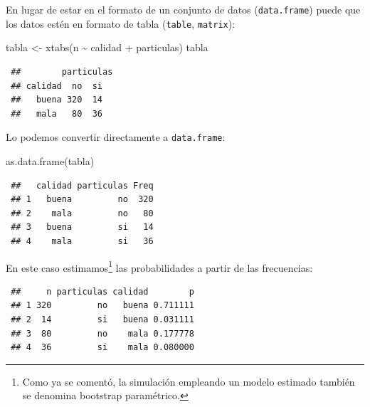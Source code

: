 \documentclass[
  10pt,
]{book}
\newenvironment{Shaded}{\begin{snugshade}}{\end{snugshade}}
\newcommand{\FunctionTok}[1]{\textcolor[rgb]{0.00,0.00,0.00}{#1}}
\newcommand{\NormalTok}[1]{#1}
\newcommand{\OtherTok}[1]{\textcolor[rgb]{0.56,0.35,0.01}{#1}}
\newcommand{\SpecialCharTok}[1]{\textcolor[rgb]{0.00,0.00,0.00}{#1}}
\theoremstyle{break}
\theoremstyle{nonumberplain}
\let\oldfootnote\footnote
\renewcommand\footnote[1]{\oldfootnote{\hspace{2mm}#1}}
\begin{document}
En lugar de estar en el formato de un conjunto de datos (\texttt{data.frame}) puede que los datos estén en formato de tabla (\texttt{table}, \texttt{matrix}):

\begin{Shaded}
\begin{Highlighting}[]
\NormalTok{tabla }\OtherTok{\textless{}{-}} \FunctionTok{xtabs}\NormalTok{(n }\SpecialCharTok{\textasciitilde{}}\NormalTok{ calidad }\SpecialCharTok{+}\NormalTok{ particulas)}
\NormalTok{tabla}
\end{Highlighting}
\end{Shaded}

\begin{verbatim}
 ##        particulas
 ## calidad  no  si
 ##   buena 320  14
 ##   mala   80  36
\end{verbatim}

Lo podemos convertir directamente a \texttt{data.frame}:

\begin{Shaded}
\begin{Highlighting}[]
\FunctionTok{as.data.frame}\NormalTok{(tabla)}
\end{Highlighting}
\end{Shaded}

\begin{verbatim}
 ##   calidad particulas Freq
 ## 1   buena         no  320
 ## 2    mala         no   80
 ## 3   buena         si   14
 ## 4    mala         si   36
\end{verbatim}

En este caso estimamos\footnote{Como ya se comentó, la simulación empleando un modelo estimado también se denomina bootstrap paramétrico.} las probabilidades a partir de las frecuencias:

\begin{Shaded}
\end{Shaded}

\begin{verbatim}
 ##     n particulas calidad        p
 ## 1 320         no   buena 0.711111
 ## 2  14         si   buena 0.031111
 ## 3  80         no    mala 0.177778
 ## 4  36         si    mala 0.080000
\end{verbatim}
\end{document}
